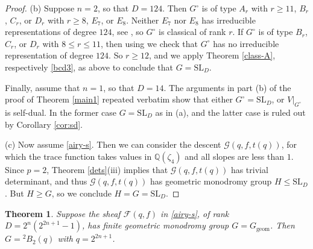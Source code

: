 \documentclass[11pt]{amsart}
\theoremstyle{plain}
\newtheorem{thm}{Theorem}
\theoremstyle{definition}
\numberwithin{thm}{section}
\numberwithin{equation}{thm}
\newcommand{\SL}{\mathrm{SL}}
\newcommand{\sF}{{\mathcal F}}
\newcommand{\sG}{{\mathcal G}}
\newcommand{\Q}{{\mathbb Q}}
\newcommand{\0}{\emptyset}
\newcommand{\geo}{{\mathrm {geom}}}
\newcommand{\tw}[1]{{}^#1\!}
\begin{document}
\begin{proof}
\smallskip
(b) Suppose $n=2$, so that $D=124$. Then $G^\circ$ is of type $A_r$ with $r \geq 11$, $B_r$, $C_r$, or $D_r$ with $r \geq 8$, 
$E_7$, or $E_8$. Neither $E_7$ nor $E_8$ has irreducible representations of degree $124$, see \cite{Lu}, so $G^\circ$ is classical of 
rank $r$. If $G^\circ$ is of type $B_r$, $C_r$, or $D_r$ with $8 \leq r \leq 11$, then using \cite{Lu} we check that $G^\circ$ has no 
irreducible representation of degree $124$. So $r \geq 12$, and we apply Theorem \ref{class-A}, respectively \eqref{bcd3}, as 
above to conclude that $G = \SL_D$.

Finally, assume that $n=1$, so that $D=14$. The arguments in part (b) of the proof of Theorem \ref{main1} repeated verbatim show
that either $G^\circ = \SL_D$, or $V|_{G^\circ}$ is self-dual. In the former 
case $G = \SL_D$ as in (a), and the latter case
is ruled out by Corollary \ref{cor:sd}.

\smallskip
(c) Now assume \eqref{airy-s}. Then we can consider the descent $\sG(q,f,t(q))$, for which the trace function takes values in $\Q(\zeta_4)$
and all slopes are less than $1$. Since $p=2$, Theorem \ref{dets}(iii)
implies that $\sG(q,f,t(q))$ has trivial determinant, and thus $\sG(q,f,t(q))$ has geometric monodromy group $H \leq \SL_D$.
But $H \geq G$, so we conclude $H=G=\SL_D$.  
\end{proof}


\begin{thm}\label{finite-m}
Suppose the sheaf $\sF(q,f)$ in \eqref{airy-s}, of rank $D=2^n(2^{2n+1}-1)$, has finite geometric monodromy group 
$G=G_\geo$. Then $G=\tw2 B_2(q)$ with $q=2^{2n+1}$.
\end{thm}
\end{document}
